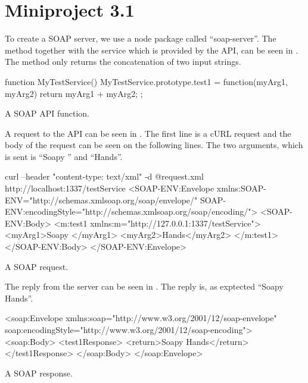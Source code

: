 \chapter{Miniproject 3.1}
To create a SOAP server, we use a node package called ``soap-server''.
The method together with the service which is provided by the API, can be seen in .
The method only returns the concatenation of two input strings.

\begin{listing}
    \begin{js}
        function MyTestService(){
        }
        MyTestService.prototype.test1 = function(myArg1, myArg2){
            return myArg1 + myArg2;
        };
    \end{js}
    \caption{A SOAP API function.}
    \label{lst:soap_func}
\end{listing}

A request to the API can be seen in .
The first line is a cURL request and the body of the request can be seen on the following lines. 
The two arguments, which is sent is ``Soapy '' and ``Hands''.

\begin{listing}
    \begin{xmlblock}
        curl --header "content-type: text/xml" -d @request.xml http://localhost:1337/testService
        <SOAP-ENV:Envelope
          xmlns:SOAP-ENV="http://schemas.xmlsoap.org/soap/envelope/"
          SOAP-ENV:encodingStyle="http://schemas.xmlsoap.org/soap/encoding/">
          <SOAP-ENV:Body>
            <m:test1 xmlns:m="http://127.0.0.1:1337/testService">
              <myArg1>Soapy </myArg1>
              <myArg2>Hands</myArg2>
            </m:test1>
          </SOAP-ENV:Body>
        </SOAP-ENV:Envelope>
    \end{xmlblock}
    \caption{A SOAP request.}
    \label{lst:soap_req}
\end{listing}

The reply from the server can be seen in .
The reply is, as exptected ``Soapy Hands''.

\begin{listing}
    \begin{xmlblock}
        <soap:Envelope
                xmlns:soap="http://www.w3.org/2001/12/soap-envelope"
                soap:encodingStyle="http://www.w3.org/2001/12/soap-encoding">
                <soap:Body>
                        <test1Response>
                                <return>Soapy Hands</return>
                        </test1Response>
                </soap:Body>
        </soap:Envelope>
    \end{xmlblock}
    \caption{A SOAP response.}
    \label{lst:soap_respond}
\end{listing}
